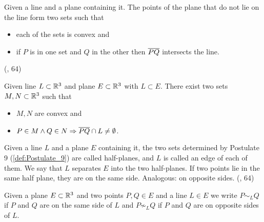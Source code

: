 \begin{definition}\label{def:Postulate_9}
  Given a line and a plane containing it.
  The points of the plane that do not lie on the line form two sets such that
  \begin{itemize}
    \item each of the sets is convex and
    \item if $P$ is in one set and $Q$ in the other then $\overline{PQ}$ intersects the line.
  \end{itemize}
  (\cite{SMSGGeometry}, 64)

  Given line $L\subset\mathbb{R}^3$ and plane $E\subset \mathbb{R}^3$ with $L \subset E$.
  There exist two sets $M,N \subset\mathbb{R}^3$ such that
  \begin{itemize}
    \item $M,N$ are convex and
    \item $P \in M \land Q \in N \Rightarrow \overline{PQ}\cap L \ne \emptyset$.
  \end{itemize}

\end{definition}

\begin{definition}\label{def:Half-Planes}
  Given a line $L$ and a plane $E$ containing it, the two sets determined by Postulate 9 (\ref{def:Postulate_9}) are called half-planes, and $L$ is called an edge of each of them.
  We say that $L$ separates $E$ into the two half-planes.
  If two points lie in the same half plane, they are on the same side. Analogous: on opposite sides.
  (\cite{SMSGGeometry}, 64)

  Given a plane $E \subset \mathbb{R}^3$ and two points $P,Q \in E$ and a line $L \in E$ we write
  $P\sim_L Q$ if $P$ and $Q$ are on the same side of $L$ and
  $P\not\sim_L Q$ if $P$ and $Q$ are on opposite sides of $L$.
\end{definition}

